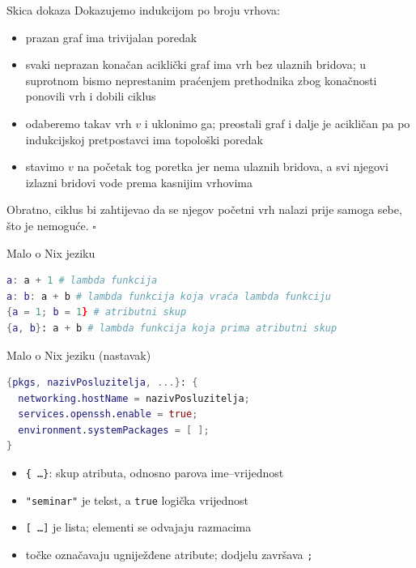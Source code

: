 \documentclass{beamer}
\begin{document}
\begin{frame}{Skica dokaza}
	Dokazujemo indukcijom po broju vrhova:
	\begin{itemize}
		\item[1.] prazan graf ima trivijalan poredak
		\item[2.] svaki neprazan konačan aciklički graf ima vrh bez ulaznih bridova; u suprotnom bismo neprestanim praćenjem prethodnika zbog konačnosti ponovili vrh i dobili ciklus
		\item[3.] odaberemo takav vrh $v$ i uklonimo ga; preostali graf i dalje je acikličan pa po indukcijskoj pretpostavci ima topološki poredak
		\item[4.] stavimo $v$ na početak tog poretka jer nema ulaznih bridova, a svi njegovi izlazni bridovi vode prema kasnijim vrhovima
	\end{itemize}

	\vspace{0.4em}
	Obratno, ciklus bi zahtijevao da se njegov početni vrh nalazi prije samoga sebe, što je nemoguće. \hfill $\square$
\end{frame}

\begin{frame}[fragile]{Malo o Nix jeziku}
	\begin{lstlisting}[language=nix]
a: a + 1 # lambda funkcija
a: b: a + b # lambda funkcija koja vraća lambda funkciju
{a = 1; b = 1} # atributni skup
{a, b}: a + b # lambda funkcija koja prima atributni skup
\end{lstlisting}
\end{frame}

\begin{frame}[fragile]{Malo o Nix jeziku (nastavak)}
	\begin{lstlisting}[language=nix]
{pkgs, nazivPosluzitelja, ...}: {
  networking.hostName = nazivPosluzitelja;
  services.openssh.enable = true;
  environment.systemPackages = [ ];
}
\end{lstlisting}
	\begin{itemize}
		\item \texttt{\{ \ldots \}}: skup atributa, odnosno parova ime--vrijednost
		\item \verb|"seminar"| je tekst, a \texttt{true} logička vrijednost
		\item \texttt{[ \ldots ]} je lista; elementi se odvajaju razmacima
		\item točke označavaju ugniježđene atribute; dodjelu završava \texttt{;}
	\end{itemize}
\end{frame}
\end{document}

